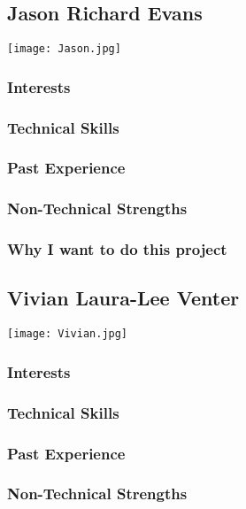 
\subsection{Jason Richard Evans}
\texttt{[image: Jason.jpg]}

\subsubsection{Interests}
\subsubsection{Technical Skills}
\subsubsection{Past Experience}
\subsubsection{Non-Technical Strengths}
\subsubsection{Why I want to do this project}

\subsection{Vivian Laura-Lee Venter}
\texttt{[image: Vivian.jpg]}

\subsubsection{Interests}
\subsubsection{Technical Skills}
\subsubsection{Past Experience}
\subsubsection{Non-Technical Strengths}

